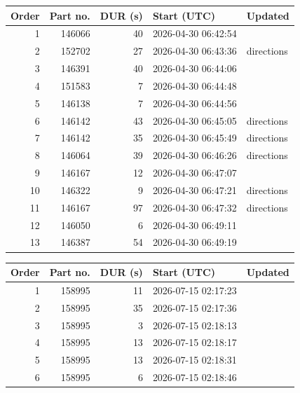 \begin{center}
\begin{minipage}[t]{0.49\linewidth}
\vspace{0pt}
\centering
{\fontsize{8}{10}\selectfont\setlength{\tabcolsep}{2pt}
\begin{tabular}{@{}rrrll@{}}
\toprule
Order & Part no. & DUR (s) & Start (UTC) & Updated \\
\midrule
1 & 146066 & 40 & 2026-04-30 06:42:54 & \\
2 & 152702 & 27 & 2026-04-30 06:43:36 & directions \\
3 & 146391 & 40 & 2026-04-30 06:44:06 & \\
4 & 151583 & 7 & 2026-04-30 06:44:48 & \\
5 & 146138 & 7 & 2026-04-30 06:44:56 & \\
6 & 146142 & 43 & 2026-04-30 06:45:05 & directions \\
7 & 146142 & 35 & 2026-04-30 06:45:49 & directions \\
8 & 146064 & 39 & 2026-04-30 06:46:26 & directions \\
9 & 146167 & 12 & 2026-04-30 06:47:07 & \\
10 & 146322 & 9 & 2026-04-30 06:47:21 & directions \\
11 & 146167 & 97 & 2026-04-30 06:47:32 & directions \\
12 & 146050 & 6 & 2026-04-30 06:49:11 & \\
13 & 146387 & 54 & 2026-04-30 06:49:19 & \\
\bottomrule
\end{tabular}}
\label{tab:motivating-dogs}
\end{minipage}\hfill
\begin{minipage}[t]{0.49\linewidth}
\vspace{0pt}
\centering
{\fontsize{8}{10}\selectfont\setlength{\tabcolsep}{2pt}
\begin{tabular}{@{}rrrll@{}}
\toprule
Order & Part no. & DUR (s) & Start (UTC) & Updated \\
\midrule
1 & 158995 & 11 & 2026-07-15 02:17:23 & \\
2 & 158995 & 35 & 2026-07-15 02:17:36 & \\
3 & 158995 & 3 & 2026-07-15 02:18:13 & \\
4 & 158995 & 13 & 2026-07-15 02:18:17 & \\
5 & 158995 & 13 & 2026-07-15 02:18:31 & \\
6 & 158995 & 6 & 2026-07-15 02:18:46 & \\

\end{tabular}}
\end{minipage}
\end{center}
